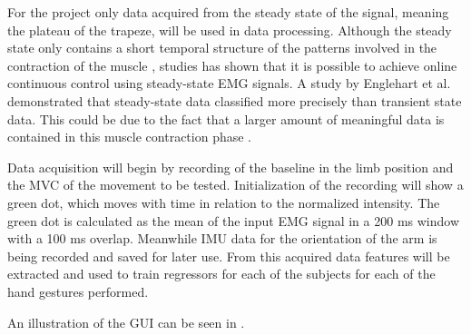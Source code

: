 For the project only data acquired from the steady state of the signal, meaning the plateau of the trapeze, will be used in data processing. Although the steady state only contains a short temporal structure of the patterns involved in the contraction of the muscle \cite{mobarak2014}, studies has shown that it is possible to achieve online continuous control using steady-state EMG signals. A study by Englehart et al. \cite{englehart2001} demonstrated that steady-state data classified more precisely than transient state data. This could be due to the fact that a larger amount of meaningful data is contained in this muscle contraction phase \cite{mobarakm2014}.

Data acquisition will begin by recording of the baseline in the limb position and the MVC of the movement to be tested. Initialization of the recording will show a green dot, which moves with time in relation to the normalized intensity. The green dot is calculated as the mean of the input EMG signal in a 200 ms window with a 100 ms overlap. Meanwhile IMU data for the orientation of the arm is being recorded and saved for later use. %
From this acquired data features will be extracted and used to train regressors for each of the subjects for each of the hand gestures performed.


An illustration of the GUI can be seen in . 

